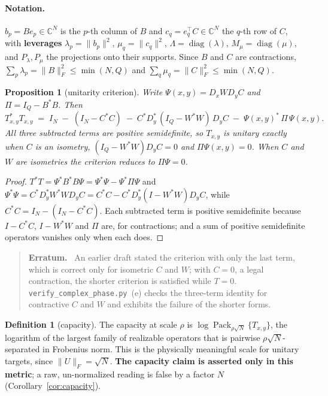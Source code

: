 \documentclass[11pt,a4paper]{article}
\theoremstyle{plain}
\newtheorem{proposition}[theorem]{Proposition}
\theoremstyle{definition}
\newtheorem{definition}[theorem]{Definition}
\theoremstyle{remark}
\DeclareMathOperator{\Pack}{Pack}
\DeclareMathOperator{\diag}{diag}
\newcommand{\C}{\mathbb C}
\newcommand{\Fro}[1]{\|#1\|_F}
\newenvironment{callout}[1]{\par\medskip\noindent\begin{quote}\small\textbf{#1}\ }{\end{quote}\medskip}
\begin{document}
\paragraph{Notation.} $b_p=Be_p\in\C^N$ is the $p$-th column of $B$ and $c_q=e_q^{\top}C\in\C^N$
the $q$-th row of $C$, with \textbf{leverages} $\lambda_p=\|b_p\|^2$, $\mu_q=\|c_q\|^2$,
$\Lambda=\diag(\lambda)$, $M_\mu=\diag(\mu)$, and $P_\lambda,P_\mu$ the projections onto their
supports. Since $B$ and $C$ are contractions, $\sum_p\lambda_p=\Fro{B}^2\le\min(N,Q)$ and
$\sum_q\mu_q=\Fro{C}^2\le\min(N,Q)$.

\begin{proposition}[unitarity criterion]\label{prop:unitarity}
Write $\Psi(x,y)=D_xWD_yC$ and $\Pi=I_Q-B^{*}B$. Then
\[
T_{x,y}^{*}T_{x,y}\;=\;I_N\;-\;(I_N-C^{*}C)\;-\;C^{*}D_y^{*}\,(I_Q-W^{*}W)\,D_yC\;-\;\Psi(x,y)^{*}\,\Pi\,\Psi(x,y).
\]
All three subtracted terms are positive semidefinite, so $T_{x,y}$ is unitary exactly when
$C$ is an isometry, $(I_Q-W^{*}W)D_yC=0$ and $\Pi\Psi(x,y)=0$. When $C$ and $W$ are
isometries the criterion reduces to $\Pi\Psi=0$.
\end{proposition}

\begin{proof}
$T^{*}T=\Psi^{*}B^{*}B\Psi=\Psi^{*}\Psi-\Psi^{*}\Pi\Psi$ and
$\Psi^{*}\Psi=C^{*}D_y^{*}W^{*}WD_yC=C^{*}C-C^{*}D_y^{*}(I-W^{*}W)D_yC$, while
$C^{*}C=I_N-(I_N-C^{*}C)$. Each subtracted term is positive semidefinite because $I-C^{*}C$,
$I-W^{*}W$ and $\Pi$ are, for contractions; and a sum of positive semidefinite operators
vanishes only when each does.
\end{proof}

\begin{callout}{Erratum.}
An earlier draft stated the criterion with only the last term, which is correct only for
isometric $C$ and $W$; with $C=0$, a legal contraction, the shorter criterion is satisfied
while $T=0$. \texttt{verify\_complex\_phase.py}~(e) checks the three-term identity for
contractive $C$ and $W$ and exhibits the failure of the shorter forms.
\end{callout}

\begin{definition}[capacity]\label{def:capacity}
The capacity at scale $\rho$ is $\log\Pack_{\rho\sqrt N}\{T_{x,y}\}$, the logarithm of the
largest family of realizable operators that is pairwise $\rho\sqrt N$-separated in Frobenius
norm. This is the physically meaningful scale for unitary targets, since $\Fro{U}=\sqrt N$.
\textbf{The capacity claim is asserted only in this metric}; a raw, un-normalized reading is
false by a factor $N$ (Corollary~\ref{cor:capacity}).
\end{definition}
\end{document}
